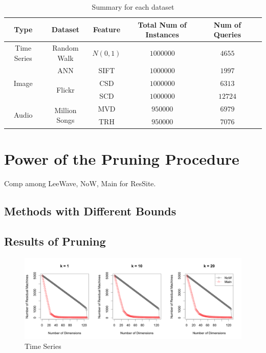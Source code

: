 \begin{table}[H]\begin{center}
\caption{Summary for each dataset}\label{table:datasets}
\begin{tabular}{|c|c|c|c|c|c|}
\hline 
Type & Dataset & Feature & Total Num of Instances & Num of Queries\\ \hline \hline
Time Series & Random Walk & $N(0,1)$ & $1000000$ & $4655$\\ \hline
\multirow{3}{*}{Image} & ANN & SIFT & $1000000$ & $1997$\\ 
\cline{2-5}
 & \multirow{2}{*}{Flickr} & CSD & $1000000$ & $6313$\\ 
 \cline{3-5}
 & & SCD &  $1000000$ & $12724$\\ \hline
 \multirow{2}{*}{Audio} & \multirow{2}{*}{Million Songs} & MVD & $950000$ & $6979$\\ 
 \cline{3-5}
 & & TRH & $950000$ & $7076$\\ \hline
\end{tabular}
\end{center}\end{table}





\section{Power of the Pruning Procedure} %
\label{s:power_of_the_pruning_procedure}

Comp among LeeWave, NoW, Main for ResSite.


\subsection{Methods with Different Bounds} %
\label{sub:methods_with_different_bounds}



\subsection{Results of Pruning} %
\label{sub:results_of_pruning}
	
\begin{figure}[htpb!]
  \centering
  \includegraphics[width=1.0\linewidth]{exp/prune/time.png}
  \caption{Time Series}
  \label{fig:prune_time}
\end{figure}

